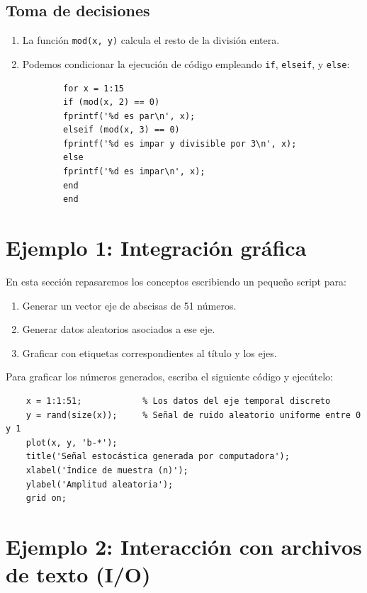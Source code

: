 \subsection{Toma de decisiones}

\begin{enumerate}
	
	\item La función \texttt{mod(x, y)} calcula el resto de la división entera.
	\item Podemos condicionar la ejecución de código empleando \texttt{if}, \texttt{elseif}, y \texttt{else}:
	\begin{verbatim}
		for x = 1:15
		if (mod(x, 2) == 0)
		fprintf('%d es par\n', x);
		elseif (mod(x, 3) == 0)
		fprintf('%d es impar y divisible por 3\n', x);
		else
		fprintf('%d es impar\n', x);
		end
		end
	\end{verbatim}
\end{enumerate}

\section{Ejemplo 1: Integración gráfica}

En esta sección repasaremos los conceptos escribiendo un pequeño script para:
\begin{enumerate}
	\item Generar un vector eje de abscisas de 51 números.
	\item Generar datos aleatorios asociados a ese eje.
	\item Graficar con etiquetas correspondientes al título y los ejes.
\end{enumerate}

Para graficar los números generados, escriba el siguiente código y ejecútelo:
\begin{verbatim}
	x = 1:1:51;            % Los datos del eje temporal discreto
	y = rand(size(x));     % Señal de ruido aleatorio uniforme entre 0 y 1
	plot(x, y, 'b-*');
	title('Señal estocástica generada por computadora');
	xlabel('Índice de muestra (n)');
	ylabel('Amplitud aleatoria');
	grid on;
\end{verbatim}

\section{Ejemplo 2: Interacción con archivos de texto (I/O)}

